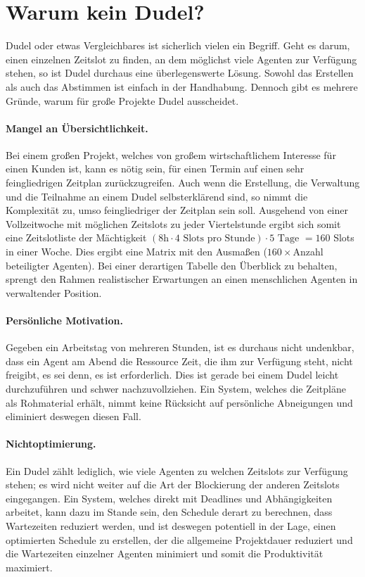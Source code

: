\documentclass[12pt,twoside]{article}
\theoremstyle{plain}
\theoremstyle{definition}
\theoremstyle{remark}
\begin{document}
\section{Warum kein Dudel?}
\label{sec:dudel}
Dudel oder etwas Vergleichbares ist sicherlich vielen ein Begriff.
Geht es darum, einen einzelnen Zeitslot zu finden, an dem möglichst viele Agenten zur Verfügung stehen, so ist Dudel durchaus eine überlegenswerte Lösung.
Sowohl das Erstellen als auch das Abstimmen ist einfach in der Handhabung.
Dennoch gibt es mehrere Gründe, warum für große Projekte Dudel ausscheidet.
\paragraph{Mangel an Übersichtlichkeit.}
Bei einem großen Projekt, welches von großem wirtschaftlichem Interesse für einen Kunden ist, kann es nötig sein, für einen Termin auf einen sehr feingliedrigen Zeitplan zurückzugreifen.
Auch wenn die Erstellung, die Verwaltung und die Teilnahme an einem Dudel selbsterklärend sind, so nimmt die Komplexität zu, umso feingliedriger der Zeitplan sein soll.
Ausgehend von einer Vollzeitwoche mit möglichen Zeitslots zu jeder Viertelstunde ergibt sich somit eine Zeitslotliste der Mächtigkeit $(8\text{h}\cdot4\text{ Slots pro Stunde})\cdot5\text{ Tage }=160$ Slots in einer Woche.
Dies ergibt eine Matrix mit den Ausmaßen ($160 \times$Anzahl beteiligter Agenten).
Bei einer derartigen Tabelle den Überblick zu behalten, sprengt den Rahmen realistischer Erwartungen an einen menschlichen Agenten in verwaltender Position.
\paragraph{Persönliche Motivation.}
Gegeben ein Arbeitstag von mehreren Stunden, ist es durchaus nicht undenkbar, dass ein Agent am Abend die Ressource Zeit, die ihm zur Verfügung steht, nicht freigibt, es sei denn, es ist erforderlich.
Dies ist gerade bei einem Dudel leicht durchzuführen und schwer nachzuvollziehen.
Ein System, welches die Zeitpläne als Rohmaterial erhält, nimmt keine Rücksicht auf persönliche Abneigungen und eliminiert deswegen diesen Fall.
\paragraph{Nichtoptimierung.}
Ein Dudel zählt lediglich, wie viele Agenten zu welchen Zeitslots zur Verfügung stehen; es wird nicht weiter auf die Art der Blockierung der anderen Zeitslots eingegangen.
Ein System, welches direkt mit Deadlines und Abhängigkeiten arbeitet, kann dazu im Stande sein, den Schedule derart zu berechnen, dass Wartezeiten reduziert werden, und ist deswegen potentiell in der Lage, einen optimierten Schedule zu erstellen, der die allgemeine Projektdauer reduziert und die Wartezeiten einzelner Agenten minimiert und somit die Produktivität maximiert.
\end{document}
